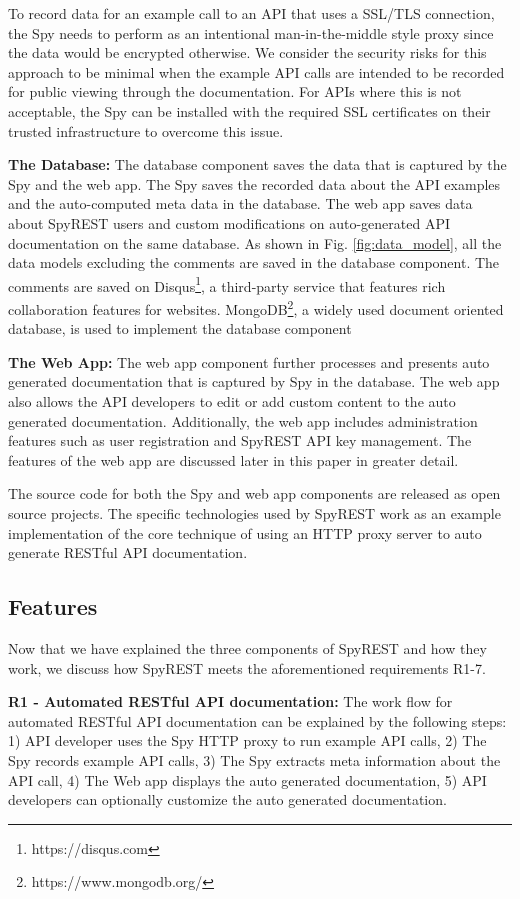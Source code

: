 \documentclass[conference]{IEEEtran}
\begin{document}
To record data for an example call to an API that uses a SSL/TLS connection, the Spy needs to perform as an intentional man-in-the-middle style proxy since the data would be encrypted otherwise. We consider the security risks for this approach to be minimal when the example API calls are intended to be recorded for public viewing through the documentation. For APIs where this is not acceptable, the Spy can be installed with the required SSL certificates on their trusted infrastructure to overcome this issue.

\textbf{The Database:} The database component saves the data that is captured by the Spy and the web app. The Spy saves the recorded data about the API examples and the auto-computed meta data in the database. The web app saves data about SpyREST users and custom modifications on auto-generated API documentation on the same database. As shown in Fig. \ref{fig:data_model}, all the data models excluding the comments are saved in the database component. The comments are saved on Disqus\footnote{https://disqus.com}, a third-party service that features rich collaboration features for websites. MongoDB\footnote{https://www.mongodb.org/}, a widely used document oriented database, is used to implement the database component

\textbf{The Web App:} The web app component further processes and presents auto generated documentation that is captured by Spy in the database. The web app also allows the API developers to edit or add custom content to the auto generated documentation. Additionally, the web app includes administration features such as user registration and SpyREST API key management. The features of the web app are discussed later in this paper in greater detail.

The source code for both the Spy and web app components are released as open source projects. The specific technologies used by SpyREST work as an example implementation of the core technique of using an HTTP proxy server to auto generate RESTful API documentation.

\subsection{Features} %

Now that we have explained the three components of SpyREST and how they work, we discuss how SpyREST meets the aforementioned requirements R1-7.

\textbf{R1 - Automated RESTful API documentation:} The work flow for automated RESTful API documentation can be explained by the following steps: 1) API developer uses the Spy HTTP proxy to run example API calls, 2) The Spy records example API calls, 3) The Spy extracts meta information about the API call, 4) The Web app displays the auto generated documentation, 5) API developers can optionally customize the auto generated documentation.
\end{document}
